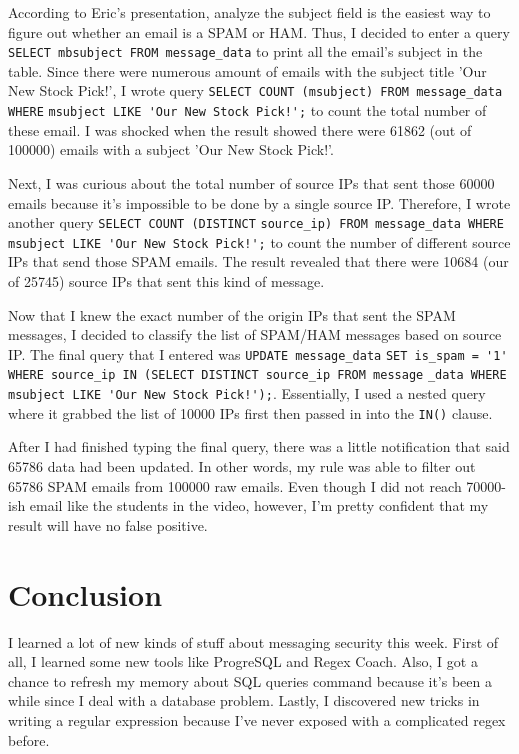 \documentclass[letterpaper,10pt,titlepage,draftclsnofoot,onecolumn]{IEEEtran}
\begin{document}
According to Eric's presentation, analyze the subject field is the easiest way to figure out whether an email is a SPAM or HAM. 
Thus, I decided to enter a query \verb|SELECT mbsubject FROM message_data| to print all the email's subject in the table.
Since there were numerous amount of emails with the subject title 'Our New Stock Pick!', I wrote query \verb|SELECT COUNT (msubject) FROM message_data WHERE| \verb|msubject LIKE 'Our New Stock Pick!';| to count the total number of these email. 
I was shocked when the result showed there were 61862 (out of 100000) emails with a subject 'Our New Stock Pick!'.

Next, I was curious about the total number of source IPs that sent those 60000 emails because it's impossible to be done by a single source IP.
Therefore, I wrote another query \verb|SELECT COUNT (DISTINCT| \verb|source_ip) FROM message_data WHERE msubject LIKE 'Our New Stock Pick!';| to count the number of different source IPs that send those SPAM emails.
The result revealed that there were 10684 (our of 25745) source IPs that sent this kind of message.

Now that I knew the exact number of the origin IPs that sent the SPAM messages, I decided to classify the list of SPAM/HAM messages based on source IP.
The final query that I entered was \verb|UPDATE message_data| \verb|SET is_spam = '1' WHERE source_ip IN (SELECT DISTINCT source_ip FROM message| \verb|_data WHERE msubject LIKE 'Our New Stock Pick!');|. 
Essentially, I used a nested query where it grabbed the list of 10000 IPs first then passed in into the \verb|IN()| clause.

After I had finished typing the final query, there was a little notification that said 65786 data had been updated. 
In other words, my rule was able to filter out 65786 SPAM emails from 100000 raw emails.
Even though I did not reach 70000-ish email like the students in the video, however, I'm pretty confident that my result will have no false positive.

\section{Conclusion}
I learned a lot of new kinds of stuff about messaging security this week.
First of all, I learned some new tools like ProgreSQL and Regex Coach.
Also, I got a chance to refresh my memory about SQL queries command because it's been a while since I deal with a database problem.
Lastly, I discovered new tricks in writing a regular expression because I've never exposed with a complicated regex before.
\end{document}
